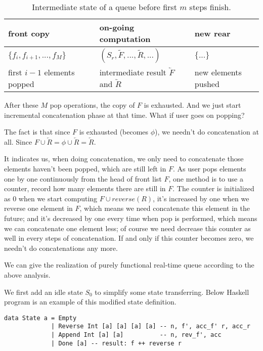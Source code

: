 \documentclass{article}
\begin{document}
\begin{table}
\centering
\begin{tabular}{l l l}
  front copy & on-going computation & new rear \\
  \hline
  $\{ f_i, f_{i+1}, ..., f_M \}$ & $(S_r, \tilde{F}, ..., \tilde{R}, ...)$ & $ \{ ... \}$ \\
  first $i-1$ elements popped & intermediate result $\overleftarrow{F}$ and $\overleftarrow{R}$ & new elements pushed
\end{tabular}
\caption{Intermediate state of a queue before first $m$ steps finish.}
\label{tab:pop-before-m}
\end{table}

After these $M$ pop operations, the copy of $F$ is exhausted. And we just
start incremental concatenation phase at that time. What if user goes
on popping?

The fact is that since $F$ is exhausted (becomes $\phi$), we needn't do concatenation
at all. Since $F \cup \overleftarrow{R} = \phi \cup \overleftarrow{R} = \overleftarrow{R}$.

It indicates us, when doing concatenation, we only need to concatenate those elements
haven't been popped, which are still left in $F$. As user pops elements one by one
continuously from the head of front list $F$, one method is to use a counter,
record how many elements there are still in $F$. The counter is initialized as 0
when we start computing $F \cup reverse(R)$, it's increased by one when we reverse
one element in $F$, which means we need concatenate this element in the future;
and it's decreased by one every time when pop is
performed, which means we can concatenate one element less; of course we need decrease
this counter as well in every steps of concatenation. If and only if this counter
becomes zero, we needn't do concatenations any more.

We can give the realization of purely functional real-time queue according to the above
analysis.

We first add an idle state $S_0$ to simplify some state transferring. Below Haskell program
is an example of this modified state definition.

\lstset{language=Haskell}
\begin{lstlisting}
data State a = Empty
             | Reverse Int [a] [a] [a] [a] -- n, f', acc_f' r, acc_r
             | Append Int [a] [a]          -- n, rev_f', acc
             | Done [a] -- result: f ++ reverse r
\end{lstlisting}
\end{document}
